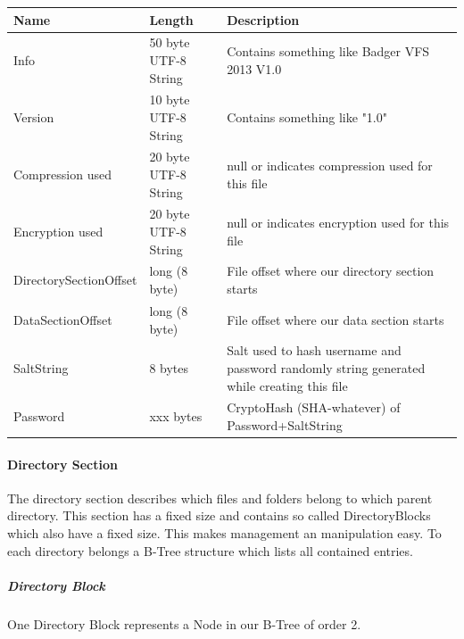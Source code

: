 \begin{tabular}{|l|l|p{5cm}|}
\hline
  \textbf{Name} & \textbf{Length} & \textbf{Description}
\\  \hline
  Info & 50 byte UTF-8 String & Contains something like Badger VFS 2013 V1.0 
\\ \hline
  Version & 10 byte UTF-8 String & Contains something like "1.0"
\\ \hline
  Compression used & 20 byte UTF-8 String & null or indicates compression used for this file
\\ \hline
  Encryption used & 20 byte UTF-8 String & null or indicates encryption used for this file
\\ \hline
 DirectorySectionOffset & long (8 byte) &  File offset where our directory section
 starts \\ \hline
 DataSectionOffset & long (8 byte) &  File offset where our data section starts
\\ \hline
 SaltString & 8 bytes  & Salt used to hash username and password randomly string generated while creating this
   file
 \\ \hline
  Password & xxx bytes  & CryptoHash (SHA-whatever) of Password+SaltString
\\ \hline

\end{tabular}


\paragraph{Directory Section}

The directory section describes which files and folders belong to which parent directory. This section has a fixed size and contains so called DirectoryBlocks which also have a fixed size. This makes management an manipulation easy. To each directory belongs a B-Tree structure which lists all contained entries.


\subparagraph*{Directory Block}

One Directory Block represents a Node in our B-Tree of order 2.

